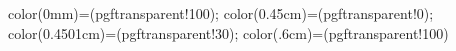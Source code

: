 {
  color(0mm)=(pgftransparent!100);
  color(0.45cm)=(pgftransparent!0);
  color(0.4501cm)=(pgftransparent!30);
  color(.6cm)=(pgftransparent!100)
}

\newcommand{\markstone}[3][green]{
\begin{scope}
\pgfsetfading{stonemarking}{\pgftransformshift{\pgfpoint{#2cm}{#3cm}}};
\fill [#1, even odd rule] (#2, #3) circle (.6) circle (.45);
\end{scope}
}